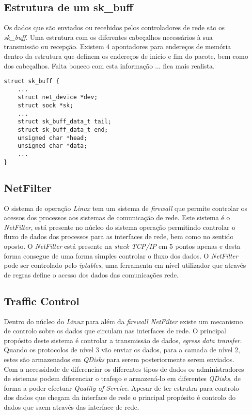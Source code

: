 \subsection{Estrutura de um sk\_buff}
 Os dados que são enviados ou recebidos pelos controladores de rede são os \textit{sk\_buff}. Uma estrutura com os diferentes cabeçalhos necessários à sua transmissão ou recepção.
 Existem 4 apontadores para endereços de memória dentro da estrutura que definem os endereços de inicio e fim do pacote, bem como dos cabeçalhos.
 Falta boneco com esta informação ... fica mais realista.
 
\lstset{language=C}
\begin{lstlisting}
struct sk_buff {
	...
	struct net_device *dev;
	struct sock *sk;
	...
	struct sk_buff_data_t tail;
	struct sk_buff_data_t end;
	unsigned char *head;
	unsigned char *data;
	...
}
\end{lstlisting}

\subsection{NetFilter}

O sistema de operação \textit{Linux} tem um sistema de \textit{firewall} que permite controlar os acessos dos processos aos sistemas de comunicação de rede.
 Este sistema é o \textit{NetFilter}, está presente no núcleo do sistema operação permitindo controlar o fluxo de dados dos processos para as interfaces de rede, bem como no sentido oposto.
 O \textit{NetFilter} está presente na \textit{stack TCP/IP} em 5 pontos apenas e desta forma consegue de uma forma simples controlar o fluxo dos dados.
 O \textit{NetFilter} pode ser controlado pelo \textit{iptables}, uma ferramenta em nível utilizador que através de regras define o acesso dos dados das comunicações rede.

\subsection{Traffic Control}
 Dentro do núcleo do \textit{Linux} para além da \textit{firewall NetFilter} existe um mecanismo de controlo sobre os dados que circulam nas interfaces de rede.
 O principal propósito deste sistema é controlar a transmissão de dados, \textit{egress data transfer}.
 Quando os protocolos de nível 3 vão enviar os dados, para a camada de nível 2, estes são armazenados em \textit{QDisks} para serem posteriormente serem enviados.
 Com a necessidade de diferenciar os diferentes tipos de dados os administradores de sistemas podem diferenciar o trafego e armazená-lo em diferentes \textit{QDisks}, de forma a poder efectuar \textit{Quality of Service}.
Apesar de ter estrutra para controlo dos dados que chegam da interface de rede o principal propósito é controlo do dados que saem através das interface de rede.


